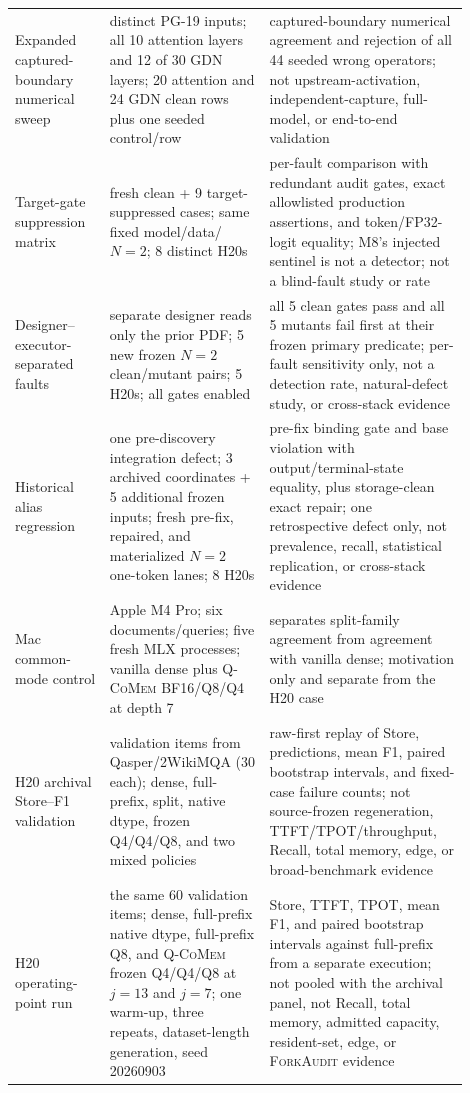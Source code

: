 \documentclass{article}
\newcommand{\qcomem}{\textsc{Q-CoMem}}
\newcommand{\method}{\textsc{ForkAudit}}
\begin{document}
\begin{longtable}{@{}>{\raggedright\arraybackslash}p{0.19\linewidth}>{\raggedright\arraybackslash}p{0.32\linewidth}>{\raggedright\arraybackslash}p{0.39\linewidth}@{}}
  Expanded captured-boundary numerical sweep & 2 distinct PG-19 inputs; all 10 attention layers and 12 of 30 GDN layers; 20 attention and 24 GDN clean rows plus one seeded control/row & captured-boundary numerical agreement and rejection of all 44 seeded wrong operators; not upstream-activation, independent-capture, full-model, or end-to-end validation \\
  Target-gate suppression matrix & 9 fresh clean + 9 target-suppressed cases; same fixed model/data/$N=2$; 8 distinct H20s & per-fault comparison with redundant audit gates, exact allowlisted production assertions, and token/FP32-logit equality; M8's injected sentinel is not a detector; not a blind-fault study or rate \\
  Designer--executor-separated faults & separate designer reads only the prior PDF; 5 new frozen $N=2$ clean/mutant pairs; 5 H20s; all gates enabled & all 5 clean gates pass and all 5 mutants fail first at their frozen primary predicate; per-fault sensitivity only, not a detection rate, natural-defect study, or cross-stack evidence \\
  Historical alias regression & one pre-discovery integration defect; 3 archived coordinates + 5 additional frozen inputs; fresh pre-fix, repaired, and materialized $N=2$ one-token lanes; 8 H20s & pre-fix binding gate and base violation with output/terminal-state equality, plus storage-clean exact repair; one retrospective defect only, not prevalence, recall, statistical replication, or cross-stack evidence \\
  Mac common-mode control & Apple M4 Pro; six documents/queries; five fresh MLX processes; vanilla dense plus \qcomem{} BF16/Q8/Q4 at depth 7 & separates split-family agreement from agreement with vanilla dense; motivation only and separate from the H20 case \\
  H20 archival Store--F1 validation & 60 validation items from Qasper/2WikiMQA (30 each); dense, full-prefix, split, native dtype, frozen Q4/Q4/Q8, and two mixed policies & raw-first replay of Store, predictions, mean F1, paired bootstrap intervals, and fixed-case failure counts; not source-frozen regeneration, TTFT/TPOT/throughput, Recall, total memory, edge, or broad-benchmark evidence \\
  H20 operating-point run & the same 60 validation items; dense, full-prefix native dtype, full-prefix Q8, and \qcomem{} frozen Q4/Q4/Q8 at $j=13$ and $j=7$; one warm-up, three repeats, dataset-length generation, seed 20260903 & Store, TTFT, TPOT, mean F1, and paired bootstrap intervals against full-prefix from a separate execution; not pooled with the archival panel, not Recall, total memory, admitted capacity, resident-set, edge, or \method{} evidence \\

\end{longtable}
\end{document}

